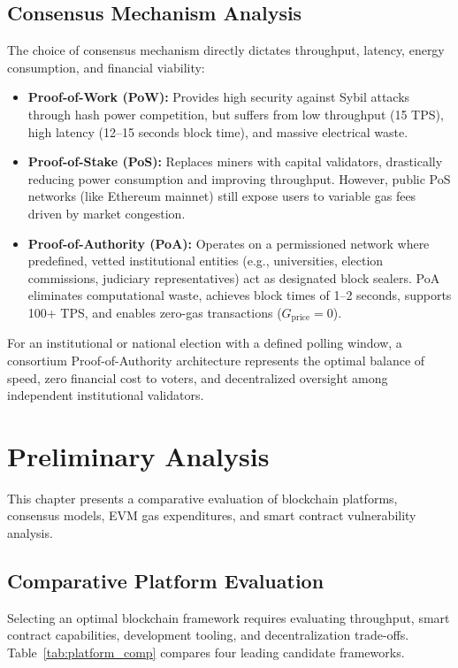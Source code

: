 \documentclass[12pt,a4paper]{report}
\begin{document}
\section{Consensus Mechanism Analysis}
The choice of consensus mechanism directly dictates throughput, latency, energy consumption, and financial viability:
\begin{itemize}
    \item \textbf{Proof-of-Work (PoW):} Provides high security against Sybil attacks through hash power competition, but suffers from low throughput (15 TPS), high latency (12--15 seconds block time), and massive electrical waste.
    \item \textbf{Proof-of-Stake (PoS):} Replaces miners with capital validators, drastically reducing power consumption and improving throughput. However, public PoS networks (like Ethereum mainnet) still expose users to variable gas fees driven by market congestion.
    \item \textbf{Proof-of-Authority (PoA):} Operates on a permissioned network where predefined, vetted institutional entities (e.g., universities, election commissions, judiciary representatives) act as designated block sealers. PoA eliminates computational waste, achieves block times of 1--2 seconds, supports 100+ TPS, and enables zero-gas transactions ($G_{\text{price}} = 0$).
\end{itemize}

For an institutional or national election with a defined polling window, a consortium Proof-of-Authority architecture represents the optimal balance of speed, zero financial cost to voters, and decentralized oversight among independent institutional validators.

\chapter{Preliminary Analysis}

This chapter presents a comparative evaluation of blockchain platforms, consensus models, EVM gas expenditures, and smart contract vulnerability analysis.

\section{Comparative Platform Evaluation}
Selecting an optimal blockchain framework requires evaluating throughput, smart contract capabilities, development tooling, and decentralization trade-offs. Table~\ref{tab:platform_comp} compares four leading candidate frameworks.
\end{document}
